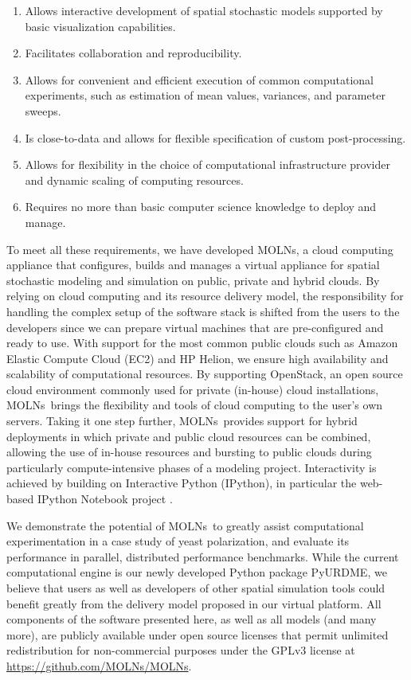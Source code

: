 \documentclass[final,leqno,onefignum,onetabnum]{siamltex1213}
\def\packagename {MOLNs}
\begin{document}
\begin{enumerate}
\item Allows interactive development of spatial stochastic models supported by basic visualization capabilities. 
\item Facilitates collaboration and reproducibility. 
\item Allows for convenient and efficient execution of common computational experiments, such as estimation of mean values, variances, and parameter sweeps. 
\item Is close-to-data and allows for flexible specification of custom post-processing. 
\item Allows for flexibility in the choice of computational infrastructure provider and dynamic scaling of computing resources.    
\item Requires no more than basic computer science knowledge to deploy and manage. 
\end{enumerate}

To meet all these requirements, we have developed \packagename, a cloud computing appliance that configures, builds and manages a virtual appliance for spatial stochastic modeling and simulation on public, private and hybrid clouds. 
By relying on cloud computing and its resource delivery model, the responsibility for handling the complex setup of the software stack is shifted from the users to the developers since we can prepare virtual machines that are pre-configured and ready to use. With support for the most common public clouds such as Amazon Elastic Compute Cloud (EC2) and HP Helion, we ensure high availability and scalability of computational resources. By supporting OpenStack, an open source cloud environment commonly used for private (in-house) cloud installations,  \packagename~brings the flexibility and tools of cloud computing to the user's own servers. Taking it one step further, \packagename~provides support for hybrid deployments in which private and public cloud resources can be combined, allowing the use of in-house resources  and bursting to public clouds during particularly compute-intensive phases of a modeling project. Interactivity is achieved by building on Interactive Python (IPython), in particular the web-based IPython Notebook project \cite{ipython, ragan2013collaborative}.  


We demonstrate the potential of \packagename~to greatly assist computational experimentation in a case study of yeast polarization, and  evaluate its performance in parallel, distributed performance benchmarks. 
While the current computational engine is our newly developed Python package PyURDME, we believe that users as well as developers of other spatial simulation tools could benefit greatly from the delivery model proposed in our virtual platform. All components of the software presented here, as well as all models (and many more), are publicly available under open source licenses that permit unlimited redistribution for non-commercial purposes under the GPLv3 license at \url{https://github.com/MOLNs/MOLNs}.
\end{document}
